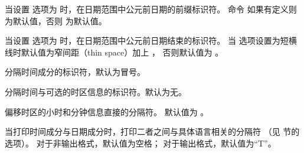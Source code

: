 \begin{ltxsyntax}

当设置  选项为  时，在日期范围中公元前日期的前缀标识符。
命令  如果有定义则为默认值，否则  为默认值。


当设置  选项为  时，在日期范围中公元前日期结束的标识符。
当  选项设置为短横线时默认值为窄间距（thin space）加上 ，
否则默认值为 。


分隔时间成分的标识符，默认为冒号。


分隔时间与可选的时区信息的标识符。默认为无。


偏移时区的小时和分钟信息直接的分隔符。
默认值为 。



当打印时间成分与日期成分时，打印二者之间与具体语言相关的分隔符
（见  节的  选项）。
对于非输出格式，默认值为空格；
对于输出格式，默认值为“T”。


\end{ltxsyntax}
